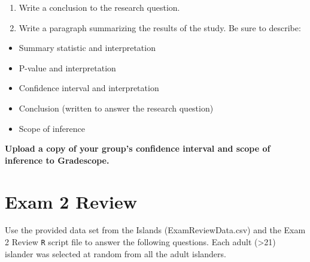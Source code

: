 \documentclass[
]{report}
\begin{document}
\vspace{0.8in}

\begin{enumerate}
\def\labelenumi{\arabic{enumi}.}
\setcounter{enumi}{13}
\item
  Write a conclusion to the research question.
  \vspace{0.8in}
\item
  Write a paragraph summarizing the results of the study. Be sure to describe:
\end{enumerate}

\begin{itemize}
\item
  Summary statistic and interpretation
\item
  P-value and interpretation
\item
  Confidence interval and interpretation
\item
  Conclusion (written to answer the research question)
\item
  Scope of inference
\end{itemize}

\textbf{Upload a copy of your group's confidence interval and scope of inference to Gradescope.}

\newpage

\hypertarget{exam-2-review}{%
\chapter{Exam 2 Review}\label{exam-2-review}}

Use the provided data set from the Islands (ExamReviewData.csv) and the Exam 2 Review \texttt{R} script file to answer the following questions. Each adult (\textgreater21) islander was selected at random from all the adult islanders.
\end{document}
